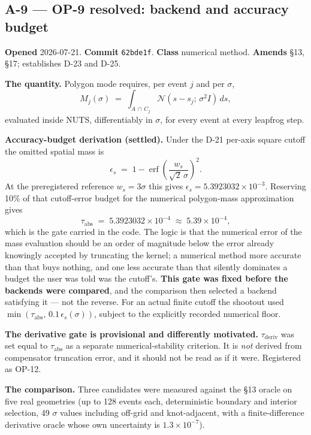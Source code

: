 \documentclass[
  10pt,
]{article}
\begin{document}
\hypertarget{a-9}{%
\subsection{A-9 --- OP-9 resolved: backend and accuracy budget}\label{a-9}}

\textbf{Opened} 2026-07-21. \textbf{Commit} \texttt{62bde1f}. \textbf{Class} numerical method. \textbf{Amends} §13, §17; establishes D-23 and D-25.

\textbf{The quantity.} Polygon mode requires, per event \(j\) and per \(\sigma\),
\[
  M_j(\sigma) \;=\; \int_{A \,\cap\, C_j} \mathcal{N}\!\left(s - s_j;\, \sigma^2 I\right)\, ds ,
\]
evaluated inside NUTS, differentiably in \(\sigma\), for every event at every leapfrog step.

\textbf{Accuracy-budget derivation (settled).} Under the D-21 per-axis square cutoff the omitted spatial mass is
\[
  \epsilon_s \;=\; 1 - \operatorname{erf}\!\left(\frac{w_s}{\sqrt{2}\,\sigma}\right)^{\!2}.
\]
At the preregistered reference \(w_s = 3\sigma\) this gives \(\epsilon_s = 5.3923032 \times 10^{-3}\). Reserving 10\% of that cutoff-error budget for the numerical polygon-mass approximation gives
\[
  \tau_{\mathrm{abs}} \;=\; 5.3923032 \times 10^{-4} \;\approx\; 5.39 \times 10^{-4},
\]
which is the gate carried in the code. The logic is that the numerical error of the mass evaluation should be an order of magnitude below the error already knowingly accepted by truncating the kernel; a numerical method more accurate than that buys nothing, and one less accurate than that silently dominates a budget the user was told was the cutoff's. \textbf{This gate was fixed before the backends were compared}, and the comparison then selected a backend satisfying it --- not the reverse. For an actual finite cutoff the shootout used \(\min\!\left(\tau_{\mathrm{abs}},\, 0.1\,\epsilon_s(\sigma)\right)\), subject to the explicitly recorded numerical floor.

\textbf{The derivative gate is provisional and differently motivated.} \(\tau_{\mathrm{deriv}}\) was set equal to \(\tau_{\mathrm{abs}}\) as a separate numerical-stability criterion. It is \emph{not} derived from compensator truncation error, and it should not be read as if it were. Registered as OP-12.

\textbf{The comparison.} Three candidates were measured against the §13 oracle on five real geometries (up to 128 events each, deterministic boundary and interior selection, 49 \(\sigma\) values including off-grid and knot-adjacent, with a finite-difference derivative oracle whose own uncertainty is \(1.3 \times 10^{-7}\)).
\end{document}
